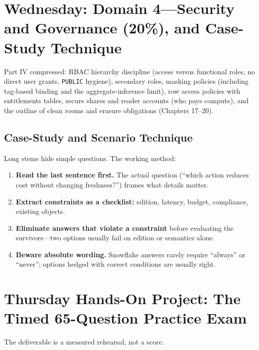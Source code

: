 \section{Wednesday: Domain 4---Security and Governance (20\%), and Case-Study Technique}
Part IV compressed: RBAC hierarchy discipline (access versus functional roles, no direct user grants, \texttt{PUBLIC} hygiene), secondary roles, masking policies (including tag-based binding and the aggregate-inference limit), row access policies with entitlements tables, secure shares and reader accounts (who pays compute), and the outline of clean rooms and erasure obligations (Chapters 17--20).

\subsection{Case-Study and Scenario Technique}
Long stems hide simple questions. The working method:
\begin{enumerate}
    \item \textbf{Read the last sentence first.} The actual question (``which action reduces cost without changing freshness?'') frames what details matter.
    \item \textbf{Extract constraints as a checklist:} edition, latency, budget, compliance, existing objects.
    \item \textbf{Eliminate answers that violate a constraint} before evaluating the survivors---two options usually fail on edition or semantics alone.
    \item \textbf{Beware absolute wording.} Snowflake answers rarely require ``always'' or ``never''; options hedged with correct conditions are usually right.
\end{enumerate}

\section{Thursday Hands-On Project: The Timed 65-Question Practice Exam}
The deliverable is a measured rehearsal, not a score.

